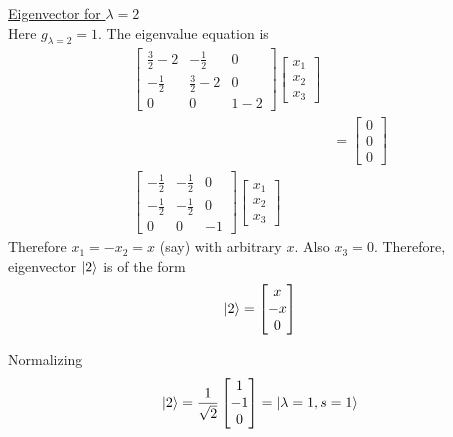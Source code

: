 \begin{enumerate}
	\underline{Eigenvector for $\lambda=2$}\\
	Here $g_{\lambda=2}=1$. The eigenvalue equation is
	\begin{align*}
		\left[\begin{matrix}
			\frac{3}{2}-2 & -\frac{1}{2} & 0 \\
			-\frac{1}{2} &\frac{3}{2}-2 & 0 \\
			0 & 0 & 1-2
		\end{matrix}\right]
		\left[\begin{matrix}
			x_1 \\ x_2 \\ x_3
		\end{matrix}\right] \\
		&=
		\left[\begin{matrix}
			0 \\ 0 \\ 0
		\end{matrix}\right] \\
		\left[\begin{matrix}
			-\frac{1}{2} & -\frac{1}{2} & 0 \\
			-\frac{1}{2} & -\frac{1}{2} & 0 \\
			0 & 0 & -1
		\end{matrix}\right]
		\left[\begin{matrix}
			x_1 \\ x_2 \\ x_3
		\end{matrix}\right]
	\end{align*}
	Therefore $x_1=-x_2=x$ (say) with arbitrary $x$. Also $x_3=0$. Therefore, eigenvector $\ket{2}$ is of the form
	\begin{equation}
		\ket{2} = \left[\begin{matrix}
			x \\ -x \\ 0
		\end{matrix}\right]
	\end{equation}
	
	Normalizing
	\begin{equation}
		\ket{2} = \frac{1}{\sqrt{2}}\left[\begin{matrix}
			1 \\ -1 \\ 0
		\end{matrix}\right] = \ket{\lambda=1,s=1}
	\end{equation}
	

\end{enumerate}
